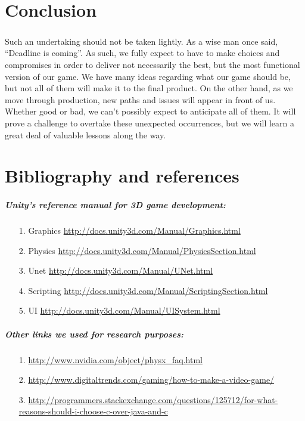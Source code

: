 \chapter{Conclusion}

\paragraph{}Such an undertaking should not be taken lightly. As a wise man once said, “Deadline is coming”. As such, we fully expect to have to make choices and compromises in order to deliver not necessarily the best, but the most functional version of our game. We have many ideas regarding what our game should be, but not all of them will make it to the final product. On the other hand, as we move through production, new paths and issues will appear in front of us. Whether good or bad, we can’t possibly expect to anticipate all of them. It will prove a challenge to overtake these unexpected occurrences, but we will learn a great deal of valuable lessons along the way.


\chapter{Bibliography and references}

\paragraph{\bfseries Unity's reference manual for 3D game development:}

\begin{itemize}
    \item[1.]{Graphics}{ \url{http://docs.unity3d.com/Manual/Graphics.html}}
    \item[2.]{Physics}{ \url{http://docs.unity3d.com/Manual/PhysicsSection.html}}
    \item[3.]{Unet}{ \url{http://docs.unity3d.com/Manual/UNet.html}}
    \item[4.]{Scripting}{ \url{http://docs.unity3d.com/Manual/ScriptingSection.html}}
    \item[5.]{UI}{ \url{http://docs.unity3d.com/Manual/UISystem.html}}
\end{itemize}

\paragraph{\bfseries Other links we used for research purposes:}

\begin{itemize}
    \item[1.]{}{ \url{http://www.nvidia.com/object/physx_faq.html}}
    \item[2.]{}{ \url{http://www.digitaltrends.com/gaming/how-to-make-a-video-game/}}
    \item[3.]{}{ \url{http://programmers.stackexchange.com/questions/125712/for-what-reasons-should-i-choose-c-over-java-and-c}}
\end{itemize}

